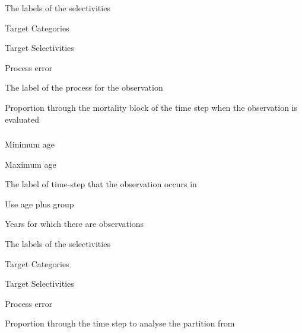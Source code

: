  {The labels of the selectivities}

 {Target Categories}

 {Target Selectivities}

 {Process error}

 {The label of the process for the observation}

 {Proportion through the mortality block of the time step when the observation is evaluated}

\subsubsection[Proportions By Category]{}

 {Minimum age}

 {Maximum age}

 {The label of time-step that the observation occurs in}

 {Use age plus group}

 {Years for which there are observations}

 {The labels of the selectivities}

 {Target Categories}

 {Target Selectivities}

 {Process error}

 {Proportion through the time step to analyse the partition from}

\subsubsection[Proportions Migrating]{}

